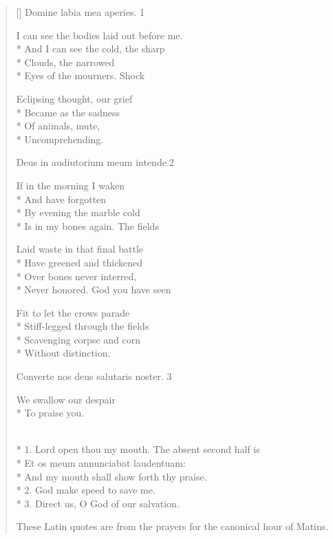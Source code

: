\label{ch:lear_bt}
\settowidth{\versewidth}{These Latin quotes are from the prayers for the canonical hour of Matins.}
\begin{verse}[\versewidth]
Domine labia mea aperies. 1

I can see the bodies laid out before me.\\*
And I can see the cold, the sharp\\*
Clouds, the narrowed\\*
Eyes of the mourners.     Shock

Eclipsing thought, our grief\\*
Became as the sadness\\*
Of animals, mute,\\*
Uncomprehending.

Deus in audiutorium meum intende.2

If in the morning I waken\\*
And have forgotten\\*
By evening the marble cold\\*
Is in my bones again.     The fields

Laid waste in that final battle\\*
Have greened and thickened\\*
Over bones never interred,\\*
Never honored.     God you have seen

Fit to let the crows parade\\*
Stiff-legged through the fields\\*
Scavenging corpse and corn\\*
Without distinction.

Converte nos deus salutaris noster. 3

We swallow our despair\\*
To praise you.

\\*
1. Lord open thou my mouth. The absent second half is\\*
   Et os meum annunciabat  laudentuam:\\*
   And my mouth shall show forth thy praise.\\*
2. God make speed to save me.\\*
3. Direct us, O God of our salvation.

These Latin quotes are from the prayers for the canonical hour of Matins.
\end{verse}
